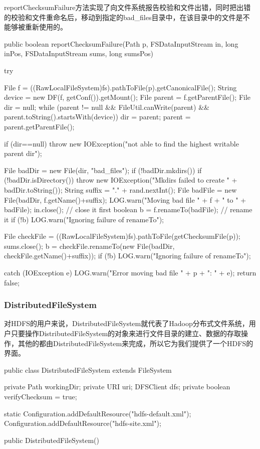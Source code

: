         reportChecksumFailure方法实现了向文件系统报告校验和文件出错，同时把出错的校验和文件重命名后，移动到指定的bad\_files目录中，在该目录中的文件是不能够被重新使用的。\\
        \begin{java}[caption=reportChecksumFailure]
public boolean reportChecksumFailure(Path p, FSDataInputStream in, long inPos, FSDataInputStream sums, long sumsPos) {
    try {
        File f = ((RawLocalFileSystem)fs).pathToFile(p).getCanonicalFile();
        String device = new DF(f, getConf()).getMount();
        File parent = f.getParentFile();
        File dir = null;
        while (parent != null && FileUtil.canWrite(parent) && parent.toString().startsWith(device)) {
            dir = parent;
            parent = parent.getParentFile();
        }

        if (dir==null) {
            throw new IOException("not able to find the highest writable parent dir");
        }
            
        File badDir = new File(dir, "bad_files");
        if (!badDir.mkdirs()) {
            if (!badDir.isDirectory()) {
            throw new IOException("Mkdirs failed to create " + badDir.toString());
            }
        }
        String suffix = "." + rand.nextInt();
        File badFile = new File(badDir, f.getName()+suffix);
        LOG.warn("Moving bad file " + f + " to " + badFile);
        in.close();                               // close it first
        boolean b = f.renameTo(badFile);                      // rename it
        if (!b) {
            LOG.warn("Ignoring failure of renameTo");
        }

        File checkFile = ((RawLocalFileSystem)fs).pathToFile(getChecksumFile(p));
        sums.close();
        b = checkFile.renameTo(new File(badDir, checkFile.getName()+suffix));
        if (!b) {
            LOG.warn("Ignoring failure of renameTo");
            }
    } catch (IOException e) {
        LOG.warn("Error moving bad file " + p + ": " + e);
    }
    return false;
}
        \end{java}

    \subsubsection{DistributedFileSystem}
        对HDFS的用户来说，DistributedFileSystem就代表了Hadoop分布式文件系统，用户只要操作DistributedFileSystem的对象来进行文件目录的建立、数据的存取操作，其他的都由DistributedFileSystem来完成，所以它为我们提供了一个HDFS的界面。
        \begin{java}[caption=DistributedFileSystem]
public class DistributedFileSystem extends FileSystem {  
    private Path workingDir;  
    private URI uri;  
    DFSClient dfs;  
    private boolean verifyChecksum = true;  
        
    static{  
        Configuration.addDefaultResource("hdfs-default.xml");  
        Configuration.addDefaultResource("hdfs-site.xml");  
    }  
    
    public DistributedFileSystem() {  
    }  
}  
        \end{java}

